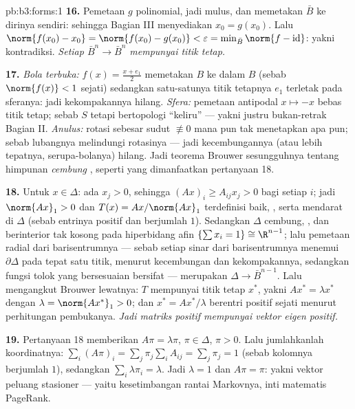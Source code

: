 \begin{solution}{pb:b3:forms:1}
\textbf{16.} Pemetaan $g$ polinomial, jadi mulus, dan memetakan
$\bar B$ ke dirinya sendiri: sehingga Bagian III menyediakan $x_0 = g(x_0)$.
Lalu $\norm{f(x_0) - x_0} = \norm{f(x_0) - g(x_0)} <
\varepsilon = \min_{\bar B}\norm{f - \operatorname{id}}$:
yakni kontradiksi. \emph{Setiap  $\bar B^n \to
\bar B^n$ mempunyai titik tetap.}

\textbf{17.} \emph{Bola terbuka:} $f(x) = \frac{x + e_1}2$ memetakan
$B$ ke dalam $B$ (sebab $\norm{f(x)} < 1$ sejati) sedangkan satu-satunya titik
tetapnya $e_1$ terletak pada sferanya: jadi kekompakannya hilang.
\emph{Sfera:} pemetaan antipodal $x \mapsto -x$ bebas
titik tetap; sebab $S$  tetapi bertopologi ``keliru''
--- yakni justru bukan-retrak Bagian II.
\emph{Anulus:} rotasi sebesar sudut $\not\equiv 0$ mana pun tak menetapkan
apa pun; sebab lubangnya melindungi rotasinya --- jadi kecembungannya (atau lebih
tepatnya,  serupa-bolanya) hilang. Jadi teorema Brouwer
sesungguhnya tentang himpunan \emph{cembung }, seperti yang dimanfaatkan
pertanyaan 18.

\textbf{18.} Untuk $x \in \Delta$: ada $x_j > 0$, sehingga $(Ax)_i
\geq A_{ij}x_j > 0$ bagi setiap $i$; jadi $\norm{Ax}_1 > 0$
dan $T(x) = Ax/\norm{Ax}_1$ terdefinisi baik, , serta
mendarat di $\Delta$ (sebab entrinya positif dan berjumlah $1$).
Sedangkan $\Delta$ cembung, , dan berinterior tak kosong pada
hiperbidang afin $\{\sum x_i = 1\} \cong \R^{n-1}$; lalu
pemetaan radial dari barisentrumnya --- sebab setiap sinar dari
barisentrumnya menemui $\partial\Delta$ pada tepat satu titik, menurut
kecembungan dan kekompakannya, sedangkan fungsi tolok
yang bersesuaian bersifat  --- merupakan  $\Delta \to
\bar B^{n-1}$. Lalu mengangkut Brouwer lewatnya: $T$ mempunyai
titik tetap $x^*$, yakni $Ax^* = \lambda x^*$ dengan $\lambda
= \norm{Ax^*}_1 > 0$; dan $x^* = Ax^*/\lambda$ berentri
positif sejati menurut perhitungan pembukanya. \emph{Jadi
matriks positif mempunyai vektor eigen positif.}

\textbf{19.} Pertanyaan 18 memberikan $A\pi = \lambda\pi$, $\pi \in
\Delta$, $\pi > 0$. Lalu jumlahkanlah koordinatnya: $\sum_i(A\pi)_i =
\sum_j\pi_j\sum_iA_{ij} = \sum_j\pi_j = 1$ (sebab kolomnya berjumlah
$1$), sedangkan $\sum_i\lambda\pi_i = \lambda$. Jadi $\lambda = 1$
dan $A\pi = \pi$: yakni vektor peluang stasioner --- yaitu
kesetimbangan rantai Markovnya, inti matematis PageRank.


\end{solution}

